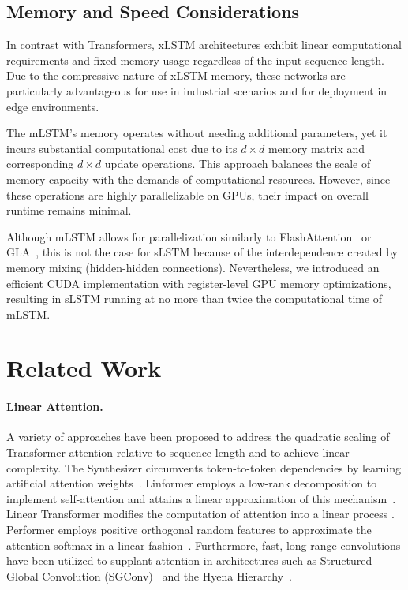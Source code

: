 \subsection{Memory and Speed Considerations}

In contrast with Transformers, xLSTM architectures exhibit linear computational requirements and fixed memory usage regardless of the input sequence length. Due to the compressive nature of xLSTM memory, these networks are particularly advantageous for use in industrial scenarios and for deployment in edge environments.

The mLSTM’s memory operates without needing additional parameters, yet it incurs substantial computational cost due to its $d \times d$ memory matrix and corresponding $d \times d$ update operations. This approach balances the scale of memory capacity with the demands of computational resources. However, since these operations are highly parallelizable on GPUs, their impact on overall runtime remains minimal.

Although mLSTM allows for parallelization similarly to FlashAttention~\citep{Dao:22,Dao:23} or GLA~\citep{Yang:23arxiv}, this is not the case for sLSTM because of the interdependence created by memory mixing (hidden-hidden connections). Nevertheless, we introduced an efficient CUDA implementation with register-level GPU memory optimizations, resulting in sLSTM running at no more than twice the computational time of mLSTM.

\section{Related Work}
\label{sec:related}

\paragraph{Linear Attention.} A variety of approaches have been proposed to address the quadratic scaling of Transformer attention relative to sequence length and to achieve linear complexity. The Synthesizer circumvents token-to-token dependencies by learning artificial attention weights~\citep{Tay:20arxiv}. Linformer employs a low-rank decomposition to implement self-attention and attains a linear approximation of this mechanism~\citep{Wang:20arxiv}. Linear Transformer modifies the computation of attention into a linear process \citep{Katharopoulos:20}. Performer employs positive orthogonal random features to approximate the attention softmax in a linear fashion~\citep{Choromanski:21}. Furthermore, fast, long-range convolutions have been utilized to supplant attention in architectures such as Structured Global Convolution (SGConv)~\citep{Li:22} and the Hyena Hierarchy~\citep{Poli:23}.

